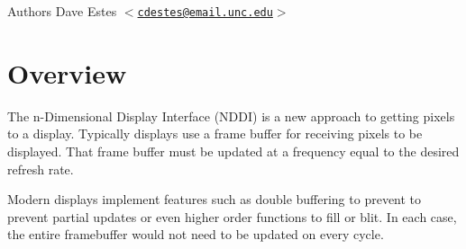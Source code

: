 \begin{DoxyAuthor}{Authors}
Dave Estes $<$\href{mailto:cdestes@email.unc.edu}{\tt cdestes@email.unc.edu}$>$
\end{DoxyAuthor}
\hypertarget{index_overview}{}\section{Overview}\label{index_overview}
The n-\/Dimensional Display Interface (NDDI) is a new approach to getting pixels to a display. Typically displays use a frame buffer for receiving pixels to be displayed. That frame buffer must be updated at a frequency equal to the desired refresh rate.

Modern displays implement features such as double buffering to prevent to prevent partial updates or even higher order functions to fill or blit. In each case, the entire framebuffer would not need to be updated on every cycle.

